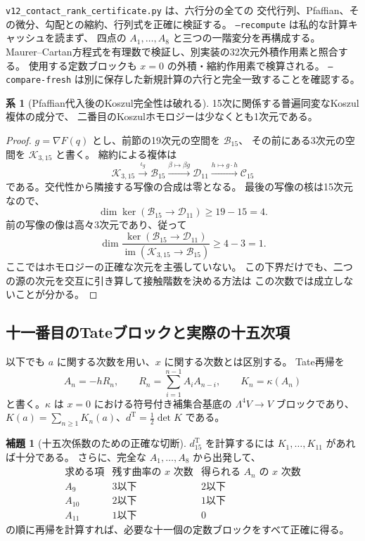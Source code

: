 \documentclass[a4paper,11pt]{ltjsarticle}
\theoremstyle{definition}
\newtheorem{lemma}[theorem]{補題}
\newtheorem{corollary}[theorem]{系}
\begin{document}
\texttt{v12\_contact\_rank\_certificate.py} は、六行分の全ての
交代行列、Pfaffian、その微分、勾配との縮約、行列式を正確に検証する。
\texttt{--recompute} は私的な計算キャッシュを読まず、
四点の $A_1,\ldots,A_8$ と三つの一階変分を再構成する。
Maurer--Cartan方程式を有理数で検証し、別実装の32次元外積作用素と照合する。
使用する定数ブロックも $x=0$ の外積・縮約作用素で検算される。
\texttt{--compare-fresh} は別に保存した新規計算の六行と完全一致することを確認する。

\begin{corollary}[Pfaffian代入後のKoszul完全性は破れる]
\label{cor:v12-koszul-homology}
15次に関係する普遍同変なKoszul複体の成分で、
二番目のKoszulホモロジーは少なくとも1次元である。
\end{corollary}
\begin{proof}
$g=\nabla F(q)$ とし、前節の19次元の空間を $\mathcal B_{15}$、
その前にある3次元の空間を $\mathcal K_{3,15}$ と書く。
縮約による複体は
\[
 \mathcal K_{3,15}\xrightarrow{\iota_g}
 \mathcal B_{15}\xrightarrow{\beta\mapsto\beta g}
 \mathcal D_{11}\xrightarrow{h\mapsto g\cdot h}\mathcal C_{15}
\]
である。交代性から隣接する写像の合成は零となる。
最後の写像の核は15次元なので、
\[
 \dim\ker(\mathcal B_{15}\to\mathcal D_{11})\ge19-15=4.
\]
前の写像の像は高々3次元であり、従って
\[
 \dim\frac{\ker(\mathcal B_{15}\to\mathcal D_{11})}
 {\operatorname{im}(\mathcal K_{3,15}\to\mathcal B_{15})}
 \ge4-3=1.
\]
ここではホモロジーの正確な次元を主張していない。
この下界だけでも、二つの源の次元を交互に引き算して接触階数を決める方法は
この次数では成立しないことが分かる。
\end{proof}

\subsection{十一番目のTateブロックと実際の十五次項}

以下でも $a$ に関する次数を用い、$x$ に関する次数とは区別する。
Tate再帰を
\[
 A_n=-hR_n,\qquad R_n=\sum_{i=1}^{n-1}A_iA_{n-i},
 \qquad K_n=\kappa(A_n)
\]
と書く。$\kappa$ は $x=0$ における符号付き補集合基底の
$\Lambda^4V\to V$ ブロックであり、
$K(a)=\sum_{n\ge1}K_n(a)$、$d^{\mathrm T}=\tfrac12\det K$ である。

\begin{lemma}[十五次係数のための正確な切断]
\label{lem:v12-exact-eleventh-truncation}
$d^{\mathrm T}_{15}$ を計算するには $K_1,\ldots,K_{11}$ があれば十分である。
さらに、完全な $A_1,\ldots,A_8$ から出発して、
\[
\begin{array}{c|c|c}
 \text{求める項}&\text{残す曲率の $x$ 次数}&
                    \text{得られる $A_n$ の $x$ 次数}\\ \hline
 A_9&3\text{以下}&2\text{以下}\\
 A_{10}&2\text{以下}&1\text{以下}\\
 A_{11}&1\text{以下}&0
\end{array}
\]
の順に再帰を計算すれば、必要な十一個の定数ブロックをすべて正確に得る。
\end{lemma}
\end{document}

